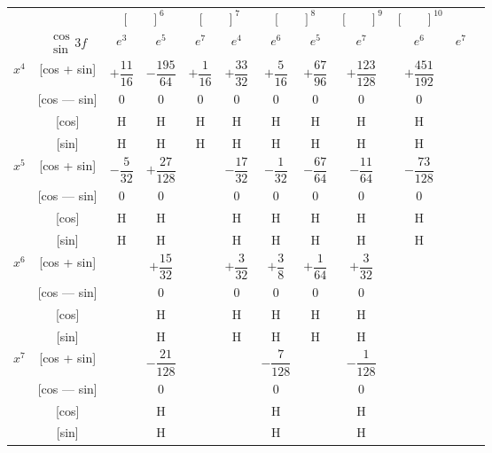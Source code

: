 \documentclass[11pt,a4paper]{book}
\begin{document}
\newpage
{}

\begin{center}
\small
\begin{tabular}{|c|c|c|c|c|c|c|c|c|c|c|c|}
\hline
& & \multicolumn{2}{c|}{$[\phantom{()}]^6$} & \multicolumn{2}{c|}{$[\phantom{()}]^7$} & \multicolumn{2}{c|}{$[\phantom{()}]^8$} & \multicolumn{1}{c|}{$[\phantom{()}]^9$} & \multicolumn{1}{c|}{$[\phantom{()}]^{10}$} \\
\cline{3-10}
& $\begin{smallmatrix} \cos \\ \sin \end{smallmatrix} 3f$ & $e^3$ & $e^5$ & $e^7$ & $e^4$ & $e^6$ & $e^5$ & $e^7$ & $e^6$ & $e^7$ \\
\hline
\multirow{4}{*}{$x^4$} & [cos + sin] & $+\dfrac{11}{16}$ & $-\dfrac{195}{64}$ & $+\dfrac{1}{16}$ & $+\dfrac{33}{32}$ & $+\dfrac{5}{16}$ & $+\dfrac{67}{96}$ & $+\dfrac{123}{128}$ & $+\dfrac{451}{192}$ \\
& [cos --- sin] & $0$ & $0$ & $0$ & $0$ & $0$ & $0$ & $0$ & $0$ \\
& [cos] & H & H & H & H & H & H & H & H \\
& [sin] & H & H & H & H & H & H & H & H \\
\hline
\multirow{4}{*}{$x^5$} & [cos + sin] & $-\dfrac{5}{32}$ & $+\dfrac{27}{128}$ & & $-\dfrac{17}{32}$ & $-\dfrac{1}{32}$ & $-\dfrac{67}{64}$ & $-\dfrac{11}{64}$ & $-\dfrac{73}{128}$ \\
& [cos --- sin] & $0$ & $0$ & & $0$ & $0$ & $0$ & $0$ & $0$ \\
& [cos] & H & H & & H & H & H & H & H \\
& [sin] & H & H & & H & H & H & H & H \\
\hline
\multirow{4}{*}{$x^6$} & [cos + sin] & & $+\dfrac{15}{32}$ & & $+\dfrac{3}{32}$ & $+\dfrac{3}{8}$ & $+\dfrac{1}{64}$ & $+\dfrac{3}{32}$ \\
& [cos --- sin] & & $0$ & & $0$ & $0$ & $0$ & $0$ \\
& [cos] & & H & & H & H & H & H \\
& [sin] & & H & & H & H & H & H \\
\hline
\multirow{4}{*}{$x^7$} & [cos + sin] & & $-\dfrac{21}{128}$ & & & $-\dfrac{7}{128}$ & & $-\dfrac{1}{128}$ \\
& [cos --- sin] & & $0$ & & & $0$ & & $0$ \\
& [cos] & & H & & & H & & H \\
& [sin] & & H & & & H & & H \\
\hline
\end{tabular}
\end{center}
\end{document}

